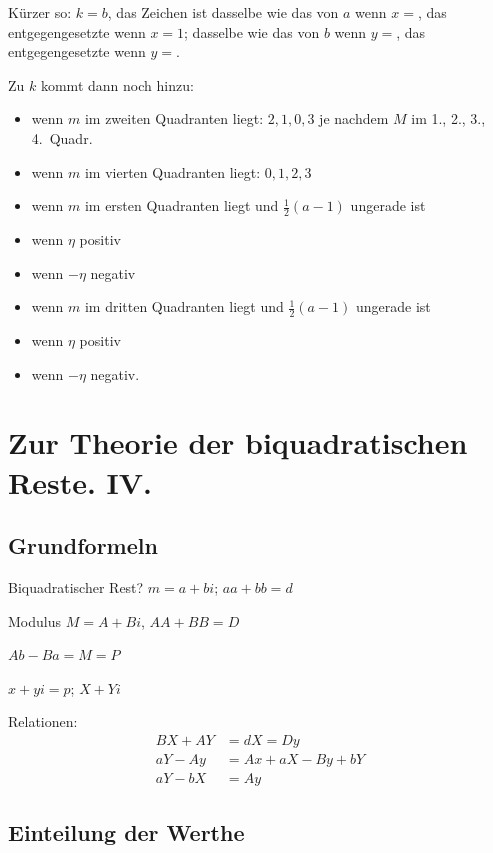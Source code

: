 \documentclass[12pt,a4paper]{article}
\begin{document}
Kürzer so: $k = b$, das Zeichen ist dasselbe wie das von $a$ wenn $x = $, das entgegengesetzte wenn $x = 1$; dasselbe wie das von $b$ wenn $y = $, das entgegengesetzte wenn $y = $.

Zu $k$ kommt dann noch hinzu:
\begin{itemize}
\item wenn $m$ im zweiten Quadranten liegt: $2, 1, 0, 3$ je nachdem $M$ im 1., 2., 3., 4.~Quadr.
\item wenn $m$ im vierten Quadranten liegt: $0, 1, 2, 3$
\item wenn $m$ im ersten Quadranten liegt und $\frac{1}{2}(a-1)$ ungerade ist
\item wenn $\eta$ positiv
\item wenn $-\eta$ negativ
\item wenn $m$ im dritten Quadranten liegt und $\frac{1}{2}(a-1)$ ungerade ist
\item wenn $\eta$ positiv
\item wenn $-\eta$ negativ.
\end{itemize}


\section*{Zur Theorie der biquadratischen Reste. IV.}

\subsection*{Grundformeln}

Biquadratischer Rest? $m = a+bi$; $aa+bb = d$

Modulus $M = A+Bi$, $AA+BB = D$

$Ab - Ba = M = P$

$x+yi = p$; $X+Yi$

Relationen:
\begin{align*}
BX + AY &= dX = Dy\\
aY - Ay &= Ax + aX - By + bY\\
aY - bX &= Ay
\end{align*}

\subsection*{Einteilung der Werthe}
\end{document}
